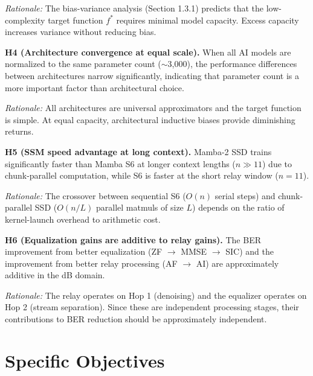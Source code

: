 \emph{Rationale:} The bias-variance analysis (Section 1.3.1) predicts that the low-complexity target function \(f^*\) requires minimal model capacity. Excess capacity increases variance without reducing bias.

\textbf{H4 (Architecture convergence at equal scale).} When all AI models are normalized to the same parameter count ($\sim$3,000), the performance differences between architectures narrow significantly, indicating that parameter count is a more important factor than architectural choice.

\emph{Rationale:} All architectures are universal approximators and the target function is simple. At equal capacity, architectural inductive biases provide diminishing returns.

\textbf{H5 (SSM speed advantage at long context).} Mamba-2 SSD trains significantly faster than Mamba S6 at longer context lengths (\(n \gg 11\)) due to chunk-parallel computation, while S6 is faster at the short relay window (\(n = 11\)).

\emph{Rationale:} The crossover between sequential S6 (\(O(n)\) serial steps) and chunk-parallel SSD (\(O(n/L)\) parallel matmuls of size \(L\)) depends on the ratio of kernel-launch overhead to arithmetic cost.

\textbf{H6 (Equalization gains are additive to relay gains).} The BER improvement from better equalization (ZF \(\to\) MMSE \(\to\) SIC) and the improvement from better relay processing (AF \(\to\) AI) are approximately additive in the dB domain.

\emph{Rationale:} The relay operates on Hop 1 (denoising) and the equalizer operates on Hop 2 (stream separation). Since these are independent processing stages, their contributions to BER reduction should be approximately independent.

\section{Specific Objectives}\label{sec:specific-objectives}

